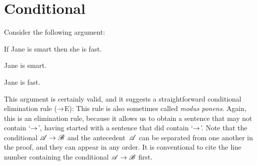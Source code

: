 \section{Conditional}
Consider the following argument:
\begin{earg}
		\item[] If Jane is smart then she is fast.
		\item[] Jane is smart.
		\item[\texttherefore] Jane is fast.
\end{earg}
This argument is certainly valid, and it suggests a straightforward conditional elimination rule ($\rightarrow$E):
This rule is also sometimes called \emph{modus ponens}. Again, this is
an elimination rule, because it allows us to obtain a sentence that
may not contain `$\rightarrow$', having started with a sentence that did
contain `$\rightarrow$'. Note that the conditional $\mathscr{A}\rightarrow\mathscr{B}$
and the antecedent~$\mathscr{A}$ can be separated from one another in
the proof, and they can appear in any order. It is conventional to
cite the line number containing the conditional
$\mathscr{A}\rightarrow\mathscr{B}$ first.

